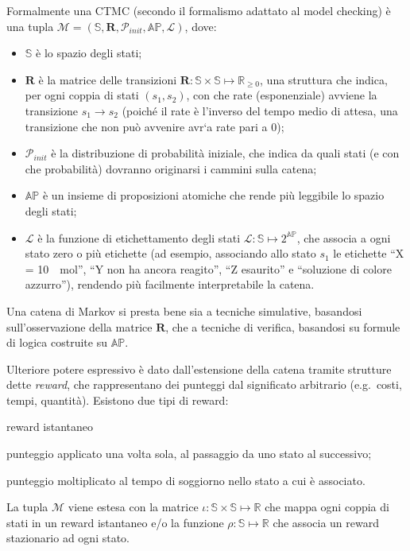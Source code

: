 	Formalmente una CTMC (secondo il formalismo adattato al model checking) \`e una tupla $\mathcal{M} = (\mathbb{S}, \mathbf{R}, \mathcal{P}_{init}, \mathbb{AP}, \mathcal{L})$, dove:
	\begin{itemize}
		\item $\mathbb{S}$ \`e lo spazio degli stati;
		\item $\mathbf{R}$ \`e la matrice delle transizioni $\mathbf{R}: \mathbb{S}\times \mathbb{S} \mapsto \mathbb{R}_{\geq 0}$, una struttura che indica, per ogni coppia di stati $(s_1, s_2)$, con che rate (esponenziale) avviene la transizione $s_1 \rightarrow s_2$ (poich\'e il rate \`e l'inverso del tempo medio di attesa, una transizione che non pu\`o avvenire avr`a rate pari a 0);
		\item $\mathcal{P}_{init}$ \`e la distribuzione di probabilit\`a iniziale, che indica da quali stati (e con che probabilit\`a) dovranno originarsi i cammini sulla catena;
		\item $\mathbb{AP}$ \`e un insieme di proposizioni atomiche che rende pi\`u leggibile lo spazio degli stati;
		\item $\mathcal{L}$ \`e la funzione di etichettamento degli stati $\mathcal{L}: \mathbb{S} \mapsto 2^{\mathbb{AP}}$, che associa a ogni stato zero o pi\`u etichette (ad esempio, associando allo stato $s_1$ le etichette ``X = \SI{10}{\mu mol}'', ``Y non ha ancora reagito'', ``Z esaurito'' e ``soluzione di colore azzurro''), rendendo pi\`u facilmente interpretabile la catena.
	\end{itemize}
	
	Una catena di Markov si presta bene sia a tecniche simulative, basandosi sull'osservazione della matrice $\mathbf{R}$, che a tecniche di verifica, basandosi su formule di logica costruite su $\mathbb{AP}$.
		
	Ulteriore potere espressivo \`e dato dall'estensione della catena tramite strutture dette \emph{reward}, che rappresentano dei punteggi dal significato arbitrario (e.g.\ costi, tempi, quantit\`a).
	Esistono due tipi di reward:
	\begin{labeling}{reward istantaneo}
		\item [reward istantaneo] punteggio applicato una volta sola, al passaggio da uno stato al successivo;
		\item [reward cumulativo] punteggio moltiplicato al tempo di soggiorno nello stato a cui \`e associato.
	\end{labeling}
	
	La tupla $\mathcal{M}$ viene estesa con la matrice $\iota : \mathbb{S} \times \mathbb{S} \mapsto \mathbb{R}$ che mappa ogni coppia di stati in un reward istantaneo e/o la funzione $\rho : \mathbb{S} \mapsto \mathbb{R}$ che associa un reward stazionario ad ogni stato.
	
